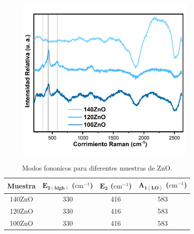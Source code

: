 \documentclass[12pt]{article}
\begin{document}
\begin{figure}[H]
    	   \begin{center}
     	  	\includegraphics[width = 0.8\textwidth]{Imagenes/RAMAN_ZnO.png}
    	   \end{center} 
        \end{figure}
\begin{table}[h!]
\centering
\caption{Modos fononicos para diferentes muestras de ZnO.}
\begin{tabular}{|c|c|c|c|}
\hline
\textbf{Muestra} & \(\mathbf{E_{2(\text{high})}}\) (\(\text{cm}^{-1}\)) & \(\mathbf{E_{2}}\) (\(\text{cm}^{-1}\)) & \(\mathbf{A_{1(\text{LO})}}\) (\(\text{cm}^{-1}\)) \\ \hline
140ZnO           & 330                                                & 416                                  & 583                                             \\ \hline
120ZnO           & 330                                                & 416                                  & 583                                             \\ \hline
100ZnO           & 330                                                & 416                                  & 583                                             \\ \hline
\end{tabular}

\label{tab:modos_vibracionales_ZnO}
\end{table}
\end{document}
